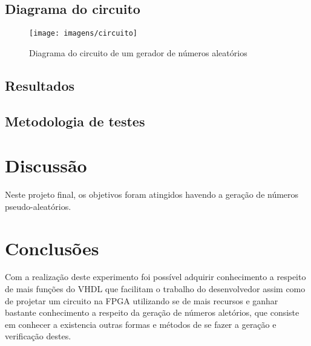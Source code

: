 \documentclass[12pts]{article}
\begin{document}
\clearpage
\subsection{Diagrama do circuito}
\begin{figure}[!htb]
  \centering
  \texttt{[image: imagens/circuito]}
  \caption{Diagrama do circuito de um gerador de números aleatórios}	
  \label{figRotulo}
\end{figure}

\newpage

\subsection{Resultados}

\subsection{Metodologia de testes}


\section{Discussão}
\iffalse
Discussão sobre os resultados encontrados, comentando detalhadamente as medições realizadas e dando a devida interpretação destas, informando se os objetivos da experimento foram alcançados. Esta é uma das partes mais importantes do relatório: aqui, há oportunidade para expressar os conhecimentos adquiridos na prática e fazer a interrelação com os fundamentos teóricos.
\fi

        Neste projeto final, os objetivos foram atingidos havendo a geração de números pseudo-aleatórios. 

\section{Conclusões}
\iffalse
Conclusões, mostrando os êxitos e eventuais problemas encontrados na realização do experimento, indicando as limitações, apresentando recomendações e/ou sugestões.
\fi

Com a realização deste experimento foi possível adquirir conhecimento a respeito de mais funções do VHDL que facilitam o trabalho do desenvolvedor assim como de projetar um circuito na FPGA utilizando se de mais recursos e ganhar bastante conhecimento a respeito da geração de números aletórios, que consiste em conhecer a existencia outras formas e métodos de se fazer a geração e verificação destes. 
\end{document}
